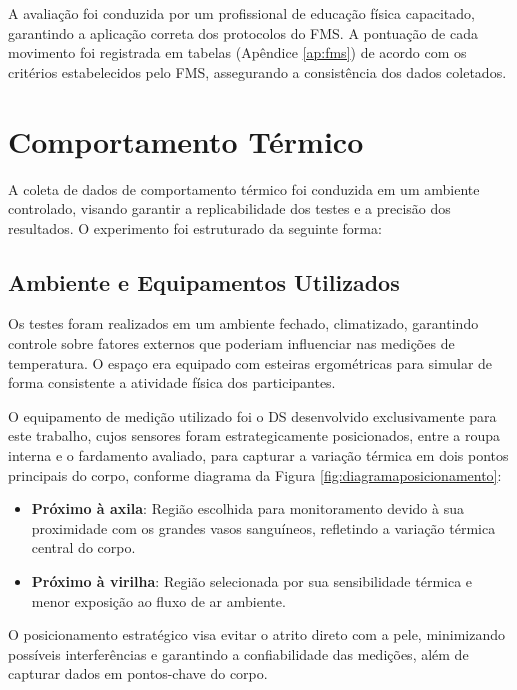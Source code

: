 A avaliação foi conduzida por um profissional de educação física capacitado, garantindo a 
aplicação correta dos protocolos do \acrshort{FMS}. A pontuação de cada movimento foi registrada 
em tabelas (Apêndice \ref{ap:fms}) de acordo com os critérios estabelecidos pelo \acrshort{FMS}, assegurando a 
consistência dos dados coletados.

\section{Comportamento Térmico}
A coleta de dados de comportamento térmico foi conduzida em um ambiente controlado, visando 
garantir a replicabilidade dos testes e a precisão dos resultados. O experimento foi 
estruturado da seguinte forma:
\subsection{Ambiente e Equipamentos Utilizados}

Os testes foram realizados em um ambiente fechado, climatizado, garantindo controle sobre fatores externos que poderiam influenciar nas medições de temperatura. O espaço era equipado com esteiras ergométricas para simular de forma consistente a atividade física dos participantes.

O equipamento de medição utilizado foi o \acrlong{DS} desenvolvido exclusivamente para este trabalho, cujos sensores foram estrategicamente posicionados, entre a roupa interna e o fardamento avaliado, para capturar a variação térmica em dois pontos principais do corpo, conforme diagrama da Figura \ref{fig:diagramaposicionamento}:

\begin{itemize}
    \item \textbf{Próximo à axila}: Região escolhida para monitoramento devido à sua proximidade com os grandes vasos sanguíneos, refletindo a variação térmica central do corpo.
    \item \textbf{Próximo à virilha}: Região selecionada por sua sensibilidade térmica e menor exposição ao fluxo de ar ambiente.
\end{itemize}    


O posicionamento estratégico visa evitar o atrito direto com a pele, minimizando possíveis interferências e garantindo a confiabilidade das medições, além de capturar dados em pontos-chave do corpo.

